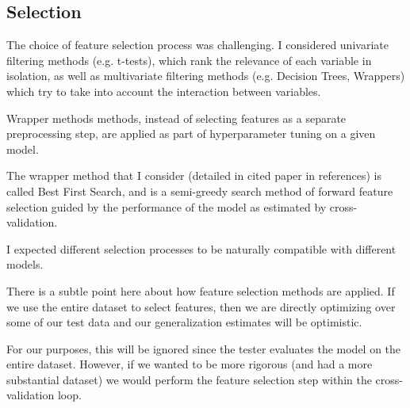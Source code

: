 \documentclass{article}
\begin{document}
\subsection{Selection}


The choice of feature selection process was challenging. I considered univariate filtering methods (e.g. t-tests), which rank the relevance of each variable in isolation, as well as multivariate filtering methods (e.g. Decision Trees, Wrappers) which try to take into account the interaction between variables.

Wrapper methods methods, instead of selecting features as a separate preprocessing step, are applied as part of hyperparameter tuning on a given model.

The wrapper method that I consider (detailed in cited paper in references) is called Best First Search, and is a semi-greedy search method of forward feature selection guided by the performance of the model as estimated by cross-validation. 

I expected different selection processes to be naturally compatible with different models.

There is a subtle point here about how feature selection methods are applied. If we use the entire dataset to select features, then we are directly optimizing over some of our test data and our generalization estimates will be optimistic.

For our purposes, this will be ignored since the tester evaluates the model on the entire dataset. However, if we wanted to be more rigorous (and had a more substantial dataset) we would perform the feature selection step within the cross-validation loop.




\end{document}
